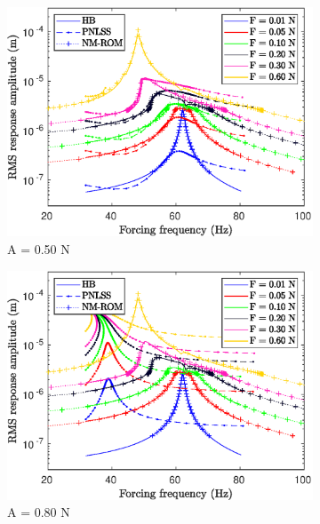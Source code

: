 \documentclass[aspectratio=169]{beamer}
\begin{document}
\begin{frame}[allowframebreaks]
\begin{figure}[!h]
\begin{subfigure}[!h]{0.2\linewidth}
      \includegraphics[width=\linewidth]{../../benchmark4/extabs_fig/b4_fresp_comp_pll_famp05_nx23}
      \caption{A = 0.50 N}
    \end{subfigure}%
    \begin{subfigure}[!h]{0.2\linewidth}
      \includegraphics[width=\linewidth]{../../benchmark4/extabs_fig/b4_fresp_comp_pll_famp08_nx23}
      \caption{A = 0.80 N}
    \end{subfigure}%
    \begin{subfigure}[!h]{0.2\linewidth}

\end{subfigure}
\end{figure}
\end{frame}
\end{document}
